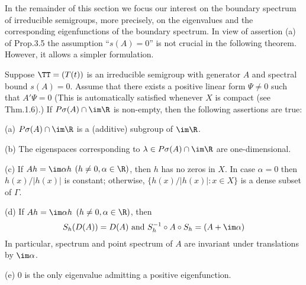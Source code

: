 In the remainder of this section we focus our interest on the boundary spectrum of irreducible semigroups, more precisely, on the eigenvalues and the corresponding eigenfunctions of the boundary spectrum. In view of assertion (a) of Prop.3.5 the assumption \enquote{$s(A) = 0$} is not crucial in the following theorem. However, it allows a simpler formulation. 
%
\begin{theorem}\label{thm:b3-3.6}
	Suppose $\TT = (T(t))$ is an irreducible semigroup with generator $A$ and spectral bound $s(A) = 0$.
	Assume that there exists a positive linear form $\Psi \neq 0$ such that $A'\Psi = 0$ (This is automatically satisfied whenever $X$ is compact (see Thm.1.6).)
	If $P\sigma(A)\cap \im\R$ is non-empty, then the following assertions are true:
	
	(a) $P\sigma(A)\cap \im\R$ is a (additive) subgroup of $\im \R$.
	
	(b) The eigenspaces corresponding to $\lambda \in P\sigma(A)\cap \im\R$ are one-dimensional.
	
	(c) If $Ah = \im\alpha h$ $(h \neq 0, \alpha \in \R)$, then $h$ has no zeros in $X$.
	In case $\alpha = 0$ then $h(x)/|h(x)|$ is constant; otherwise, $\{h(x)/|h(x)| : x \in X\}$ is a dense subset of $\Gamma$.
	
	(d) If $Ah = \im\alpha h$ $(h \neq 0, \alpha \in \R)$, then
	\begin{equation}\label{eq:b3-3.5}
		S_{h}(D(A)) = D(A) \text{ and } S_{h}^{-1}\circ A \circ S_{h} = (A + \im\alpha)
	\end{equation}
	In particular, spectrum and point spectrum of $A$ are invariant under translations by $\im \alpha$.
	
	(e) $0$ is the only eigenvalue admitting a positive eigenfunction.
\end{theorem}

